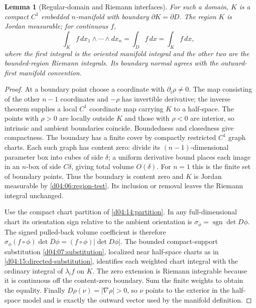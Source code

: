 \documentclass[11pt,oneside,openany]{book}
\newtheorem{lemma}[theorem]{Lemma}
\theoremstyle{definition}
\theoremstyle{remark}
\DeclareMathOperator{\sgn}{sgn}
\begin{document}
\begin{lemma}[Regular-domain and Riemann interfaces]\label{d04:12:region-interface}
For such a domain, $K$ is a compact $C^1$ embedded $n$-manifold with
boundary $\partial K=\partial D$. The region $K$ is Jordan measurable;
for continuous $f$,
\[
 \int_K f\,dx_1\wedge\cdots\wedge dx_n=\int_D f\,dx
 =\int_K f\,dx,
\]
where the first integral is the oriented manifold integral and the other
two are the bounded-region Riemann integrals. Its boundary normal agrees
with the outward-first manifold convention.
\end{lemma}
\begin{proof}
At a boundary point choose a coordinate with $\partial_i\rho\ne0$.
The map consisting of the other $n-1$ coordinates and $-\rho$ has invertible
derivative; the inverse theorem supplies a local $C^1$ coordinate map
carrying $K$ to a half-space. The points with $\rho>0$ are locally outside
$K$ and those with $\rho<0$ are interior, so intrinsic and ambient
boundaries coincide. Boundedness and closedness give compactness.
The boundary has a finite cover by compactly restricted $C^1$ graph charts.
Each such graph has content zero: divide its $(n-1)$-dimensional parameter
box into cubes of side $\delta$; a uniform derivative bound places each
image in an $n$-box of side $C\delta$, giving total volume $O(\delta)$.
For $n=1$ this is the finite set of boundary points. Thus the boundary is
content zero and $K$ is Jordan measurable by \cref{d04:06:region-test}. Its inclusion
or removal leaves the Riemann integral unchanged.

Use the compact chart partition of \cref{d04:14:partition}. In any
full-dimensional chart its orientation sign relative to the ambient
orientation is $\sigma_\phi=\sgn\det D\phi$. The signed pulled-back volume
coefficient is therefore
$\sigma_\phi(f\circ\phi)\det D\phi=(f\circ\phi)|\det D\phi|$.
The bounded compact-support substitution \cref{d04:07:substitution},
localized near half-space charts as in
\cref{d04:15:directed-substitution}, identifies each weighted chart integral
with the ordinary integral of $\lambda_i f$ on $K$. The zero extension is
Riemann integrable because it is continuous off the content-zero boundary.
Sum the finite weights to obtain the equality. Finally
$D\rho(\nu)=|\nabla\rho|>0$, so $\nu$ points to the exterior in the
half-space model and is exactly the outward vector used by the manifold
definition.
\end{proof}
\end{document}
